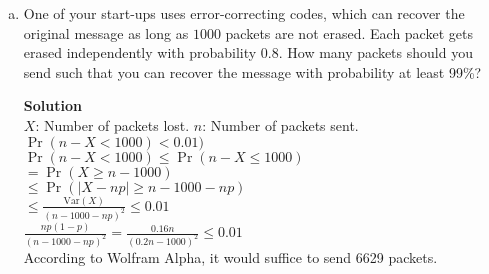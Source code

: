 \documentclass[11pt]{article}
\newenvironment{Answer}{\vspace{10pt}\begin{mdframed}\textbf{Solution}\\}{\end{mdframed}\vfill\pagebreak[3]}
\newenvironment{Answer}{\vspace{10pt}}{\vfill\pagebreak[3]}
\newcommand*{\E}{\textbf{E}}
\newcommand*{\Var}[1]{\text{Var}(#1)}
\begin{document}
\begin{enumerate}[(a)]
  Suppose that implementing an idea requires $50$ thousand dollars, and your start-up then succeeds with probability $p$, generating $150$ thousand dollars in revenue (for a net gain of $100$ thousand dollars), or fails with probability $1 - p$ (for a net loss of $50$ thousand dollars). The success of each idea is independent of every other. What is the condition on $p$ that you need to satisfy to secure the venture capitalist's funding?
  \begin{Answer}
Define $X$: total net return and $X_i$: net return on the $i$th idea. Then by Chebyshev's inequality we have $\Pr(|X-\E(X)| \geq \E(X)) \leq \frac{\Var{X}}{\E(X)^2} \leq 0.05$.\\
$\frac{\Var{X}}{\E(X)^2}=\frac{\E(X^2)-\E(X)^2}{\E(X)^2}=\frac{\E(X^2)}{\E(X)^2}-1 \leq 0.05$\\
$\E(X)=10(100,000p-50,000(1-p))$\\
$\E(X^2)=\E((X_1+...+X_n)^2)=90\E(X_1X_2)+10\E(X_1^2)$\\
$=90(100,000p-50,000(1-p))^2+10(100,000^2p-50,000^2(1-p))$\\
$\frac{\E(X^2)}{\E(X)^2} \leq 1.05 \Rightarrow \frac{90(100,000p-50,000(1-p))^2+10(100,000^2p-50,000^2(1-p))}{10^2(100,000p+50,000(1-p))^2} \leq 1.05$\\
$\Rightarrow \frac{9}{10}+\frac{90(100,000p-50,000(1-p))^2+10(100,000^2p+50,000^2(1-p))}{10^2(100,000p-50,000(1-p))^2} \leq 1.05$\\
$\Rightarrow \frac{(100,000^2p+50,000^2(1-p))}{10(100,000p-50,000(1-p))^2} \leq 0.15$\\
According to Wolfram Alpha, it would suffice for $p$ to be $0.845$.
  \end{Answer}
  
  \item One of your start-ups uses error-correcting codes, which can recover the original message as long as $1000$ packets are not erased. Each packet gets erased independently with probability $0.8$. How many packets should you send such that you can recover the message with probability at least 99\%?
  \begin{Answer}
$X$: Number of packets lost. $n$: Number of packets sent. \\
$\Pr(n-X<1000)<0.01)$\\
$\Pr(n-X<1000) \leq \Pr(n-X \leq 1000)$\\
$=\Pr(X \geq n-1000)$\\
$\leq \Pr(|X-np| \geq n-1000-np)$\\
$\leq \frac{\Var{X}}{(n-1000-np)^2} \leq 0.01$\\
$\frac{np(1-p)}{(n-1000-np)^2}=\frac{0.16n}{(0.2n-1000)^2} \leq 0.01$\\
According to Wolfram Alpha, it would suffice to send 6629 packets.
  \end{Answer}
\end{enumerate}
\end{document}
